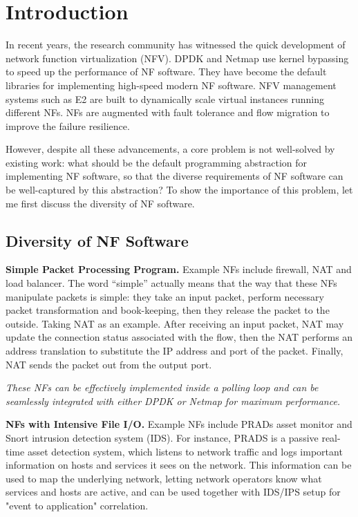 \section{Introduction}

In recent years, the research community has witnessed the quick development of
network function virtualization (NFV). DPDK \cite{dpdk} and Netmap
\cite{rizzo2012netmap} use kernel bypassing to speed up the performance of NF
software. They have become the default libraries for implementing high-speed
modern NF software. NFV management systems such as E2 \cite{palkar2015e2} are
built to dynamically scale virtual instances running different NFs. NFs are
augmented with fault tolerance \cite{sherry2015rollback} and flow migration
\cite{gember2014opennf} to improve the failure resilience.

However, despite all these advancements, a core problem is not well-solved by
existing work: what should be the default programming abstraction for implementing NF
software, so that the diverse requirements of NF software can be well-captured
by this abstraction? To show the importance of this problem, let me first discuss
the diversity of NF software.

\subsection{Diversity of NF Software}


\noindent \textbf{Simple Packet Processing Program.} Example NFs include
firewall, NAT and load balancer. The word ``simple'' actually means that the way
that these NFs manipulate packets is simple: they take an input packet,
perform necessary packet transformation and book-keeping, then they release the
packet to the outside. Taking NAT as an example. After receiving an input
packet, NAT may update the connection status associated with the flow, then the
NAT performs an address translation to substitute the IP address and port of the
packet. Finally, NAT sends the packet out from the output port.

\textit{These NFs can be effectively implemented inside a polling loop and can be
seamlessly integrated with either DPDK or Netmap for maximum performance.}

\noindent \textbf{NFs with Intensive File I/O.} Example NFs include PRADs
\cite{prads} asset monitor and Snort \cite{snort} intrusion detection system
(IDS). For instance, PRADS is a passive real-time asset detection system, which
listens to network traffic and logs important information on hosts and services
it sees on the network. This information can be used to map the underlying
network, letting network operators know what services and hosts are active, and
can be used together with IDS/IPS setup for "event to application" correlation.

